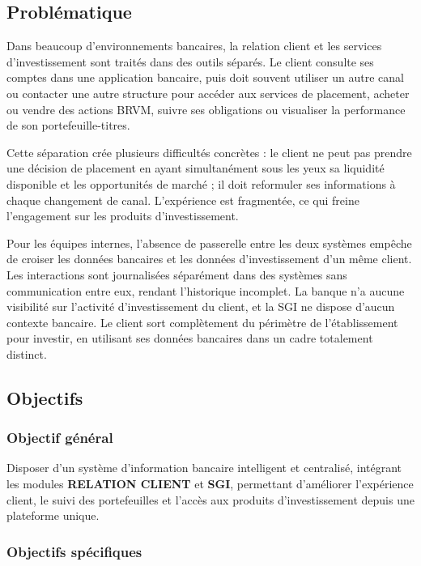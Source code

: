 \documentclass[a4paper,12pt]{report}
\begin{document}
\subsection{Problématique}

Dans beaucoup d'environnements bancaires, la relation client et les services
d'investissement sont traités dans des outils séparés. Le client consulte ses
comptes dans une application bancaire, puis doit souvent utiliser un autre canal
ou contacter une autre structure pour accéder aux services de placement, acheter
ou vendre des actions BRVM, suivre ses obligations ou visualiser la performance
de son portefeuille-titres.

Cette séparation crée plusieurs difficultés concrètes : le client ne peut pas
prendre une décision de placement en ayant simultanément sous les yeux sa
liquidité disponible et les opportunités de marché ; il doit reformuler ses
informations à chaque changement de canal. L'expérience est fragmentée, ce qui
freine l'engagement sur les produits d'investissement.

Pour les équipes internes, l'absence de passerelle entre les deux systèmes
empêche de croiser les données bancaires et les données d'investissement d'un
même client. Les interactions sont journalisées séparément dans des systèmes
sans communication entre eux, rendant l'historique incomplet. La banque n'a
aucune visibilité sur l'activité d'investissement du client, et la SGI ne
dispose d'aucun contexte bancaire. Le client sort complètement du périmètre de
l'établissement pour investir, en utilisant ses données bancaires dans un cadre
totalement distinct.

\subsection{Objectifs}

\subsubsection{Objectif général}

Disposer d'un système d'information bancaire intelligent et centralisé,
intégrant les modules \textbf{RELATION CLIENT} et \textbf{SGI}, permettant
d'améliorer l'expérience client, le suivi des portefeuilles et l'accès aux
produits d'investissement depuis une plateforme unique.

\subsubsection{Objectifs spécifiques}
\end{document}
